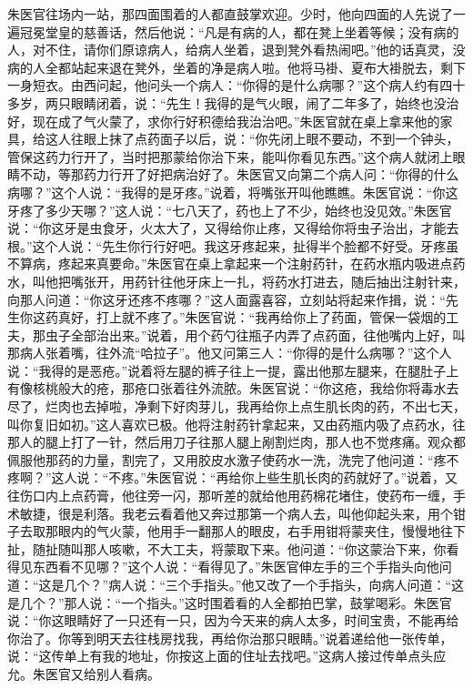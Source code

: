 \documentclass[12pt,UTF8]{ctexbook}
\begin{document}
朱医官往场内一站，那四面围着的人都直鼓掌欢迎。少时，他向四面的人先说了一遍冠冕堂皇的慈善话，然后他说：“凡是有病的人，都在凳上坐着等候；没有病的人，对不住，请你们原谅病人，给病人坐着，退到凳外看热闹吧。”他的话真灵，没病的人全都站起来退在凳外，坐着的净是病人啦。他将马褂、夏布大褂脱去，剩下一身短衣。由西问起，他问头一个病人：“你得的是什么病哪？”这个病人约有四十多岁，两只眼睛闭着，说：“先生！我得的是气火眼，闹了二年多了，始终也没治好，现在成了气火蒙了，求你行好积德给我治治吧。”朱医官就在桌上拿来他的家具，给这人往眼上抹了点药面子以后，说：“你先闭上眼不要动，不到一个钟头，管保这药力行开了，当时把那蒙给你治下来，能叫你看见东西。”这个病人就闭上眼睛不动，等那药力行开了好把病治好了。朱医官又向第二个病人问：“你得的什么病哪？”这个人说：“我得的是牙疼。”说着，将嘴张开叫他瞧瞧。朱医官说：“你这牙疼了多少天哪？”这人说：“七八天了，药也上了不少，始终也没见效。”朱医官说：“你这牙是虫食牙，火太大了，又得给你止疼，又得给你将虫子治出，才能去根。”这个人说：“先生你行行好吧。我这牙疼起来，扯得半个脸都不好受。牙疼虽不算病，疼起来真要命。”朱医官在桌上拿起来一个注射药针，在药水瓶内吸进点药水，叫他把嘴张开，用药针往他牙床上一扎，将药水打进去，随后抽出注射针来，向那人问道：“你这牙还疼不疼哪？”这人面露喜容，立刻站将起来作揖，说：“先生你这药真好，打上就不疼了。”朱医官说：“我再给你上了药面，管保一袋烟的工夫，那虫子全部治出来。”说着，用个药勺往瓶子内弄了点药面，往他嘴内上好，叫那病人张着嘴，往外流“哈拉子”。他又问第三人：“你得的是什么病哪？”这个人说：“我得的是恶疮。”说着将左腿的裤子往上一提，露出他那左腿来，在腿肚子上有像核桃般大的疮，那疮口张着往外流脓。朱医官说：“你这疮，我给你将毒水去尽了，烂肉也去掉啦，净剩下好肉芽儿，我再给你上点生肌长肉的药，不出七天，叫你复旧如初。”这人喜欢已极。他将注射药针拿起来，又由药瓶内吸了点药水，往那人的腿上打了一针，然后用刀子往那人腿上剐割烂肉，那人也不觉疼痛。观众都佩服他那药的力量，割完了，又用胶皮水激子使药水一洗，洗完了他问道：“疼不疼啊？”这人说：“不疼。”朱医官说：“再给你上些生肌长肉的药就好了。”说着，又往伤口内上点药膏，他往旁一闪，那听差的就给他用药棉花堵住，使药布一缠，手术敏捷，很是利落。我老云看着他又奔过那第一个病人去，叫他仰起头来，用个钳子去取那眼内的气火蒙，他用手一翻那人的眼皮，右手用钳将蒙夹住，慢慢地往下扯，随扯随叫那人咳嗽，不大工夫，将蒙取下来。他问道：“你这蒙治下来，你看得见东西看不见哪？”这个人说：“看得见了。”朱医官伸左手的三个手指头向他问道：“这是几个？”病人说：“三个手指头。”他又改了一个手指头，向病人问道：“这是几个？”那人说：“一个指头。”这时围着看的人全都拍巴掌，鼓掌喝彩。朱医官说：“你这眼睛好了一只还有一只，因为今天来的病人太多，时间宝贵，不能再给你治了。你等到明天去往栈房找我，再给你治那只眼睛。”说着递给他一张传单，说：“这传单上有我的地址，你按这上面的住址去找吧。”这病人接过传单点头应允。朱医官又给别人看病。
\end{document}
